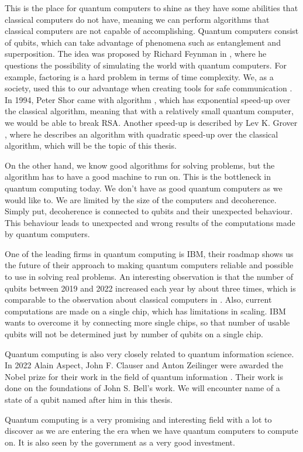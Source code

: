 This is the place for quantum computers to shine as they have some abilities that classical computers do not have, meaning we can perform algorithms that classical computers are not capable of accomplishing. Quantum computers consist of qubits, which can take advantage of phenomena such as entanglement and superposition. The idea was proposed by Richard Feynman in \cite{feynman2018simulating}, where he questions the possibility of simulating the world with quantum computers. For example, factoring is a hard problem in terms of time complexity. We, as a society, used this to our advantage when creating tools for safe communication \cite{rsa}. In 1994, Peter Shor came with algorithm \cite{shor}, which has exponential speed-up over the classical algorithm, meaning that with a relatively small quantum computer, we would be able to break RSA. Another speed-up is described by Lev K. Grover \cite{grover1996fast}, where he describes an algorithm with quadratic speed-up over the classical algorithm, which will be the topic of this thesis.

On the other hand, we know good algorithms for solving problems, but the algorithm has to have a good machine to run on. This is the bottleneck in quantum computing today. We don't have as good quantum computers as we would like to. We are limited by the size of the computers and decoherence. Simply put, decoherence is connected to qubits and their unexpected behaviour. This behaviour leads to unexpected and wrong results of the computations made by quantum computers. 

One of the leading firms in quantum computing is IBM, their roadmap \cite{roadmap} shows us the future of their approach to making quantum computers reliable and possible to use in solving real problems. An interesting observation is that the number of qubits between 2019 and 2022 increased each year by about three times, which is comparable to the observation about classical computers in \cite{moore:1965}. Also, current computations are made on a single chip, which has limitations in scaling. IBM wants to overcome it by connecting more single chips, so that number of usable qubits will not be determined just by number of qubits on a single chip.

Quantum computing is also very closely related to quantum information science. In 2022 Alain Aspect, John F. Clauser and Anton Zeilinger were awarded the Nobel prize for their work in the field of quantum information \cite{nobel}. Their work is done on the foundations of John S. Bell's work. We will encounter name of a state of a qubit named after him in this thesis.

Quantum computing is a very promising and interesting field with a lot to discover as we are entering the era when we have quantum computers to compute on. It is also seen by the government as a very good investment. 
\endinput